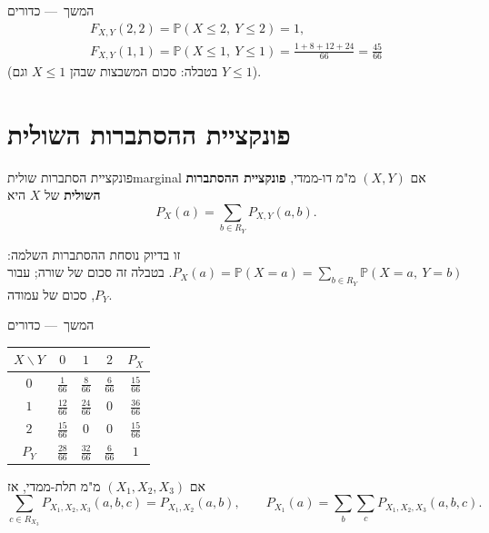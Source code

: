\documentclass[11pt,a4paper]{report}
\newcommand{\flag}{\tikz[baseline=-0.1ex,x=0.9ex,y=0.9ex]{\draw[line width=0.5pt] (0,-0.3)--(0,1.6); \fill (0,1.6)--(1.2,1.2)--(0,0.8)--cycle;}}
\newcounter{todo}
\newcommand{\addtodo}[1]{\refstepcounter{todo}%
  \addcontentsline{tdo}{todo}{\protect\numberline{\thetodo}#1}}
\newcommand{\needcheck}[1]{\addtodo{#1}%
  {\color{todoc}\sffamily\small\,[\textbf{\flag{}\,\thetodo\ לבדיקה:} #1]\,}}
\renewcommand{\needcheck}[1]{}
\newcommand{\PP}{\mathbb{P}}
\newcommand{\dash}{{\rmfamily —}}
\begin{document}
\begin{example}{המשך~\dash{} כדורים}{}
\begin{gather*}
  F_{X,Y}(2,2)=\PP(X\le2,\ Y\le2)=1,\\
  F_{X,Y}(1,1)=\PP(X\le1,\ Y\le1)=\frac{1+8+12+24}{66}=\frac{45}{66}
\end{gather*}
(בטבלה: סכום המשבצות שבהן $X\le1$ וגם $Y\le1$).
\needcheck{ברשימות נכתב רק "חיבור המשבצות"; השלמתי את הערך $\frac{45}{66}$}
\end{example}

\section{פונקציית ההסתברות השולית}

\begin{definition}{פונקציית הסתברות שולית}{marginal}
אם $(X,Y)$ מ"מ דו-ממדי, \textbf{פונקציית ההסתברות השולית} של $X$ היא
\[
  P_X(a)=\sum_{b\in R_Y}P_{X,Y}(a,b).
\]
\end{definition}

זו בדיוק נוסחת ההסתברות השלמה: $P_X(a)=\PP(X=a)=\sum_{b\in R_Y}\PP(X=a,\ Y=b)$. בטבלה זה סכום של שורה; עבור $P_Y$, סכום של עמודה.

\begin{example}{המשך~\dash{} כדורים}{}
\begin{center}
\renewcommand{\arraystretch}{1.5}
\begin{tabular}{c|ccc|c}
  $X\backslash Y$ & $0$ & $1$ & $2$ & $P_X$\\ \hline
  $0$ & $\frac1{66}$ & $\frac8{66}$ & $\frac6{66}$ & $\frac{15}{66}$\\
  $1$ & $\frac{12}{66}$ & $\frac{24}{66}$ & $0$ & $\frac{36}{66}$\\
  $2$ & $\frac{15}{66}$ & $0$ & $0$ & $\frac{15}{66}$\\ \hline
  $P_Y$ & $\frac{28}{66}$ & $\frac{32}{66}$ & $\frac6{66}$ & $1$
\end{tabular}
\end{center}
\end{example}

\begin{keybox}[title={באופן כללי}]
אם $(X_1,X_2,X_3)$ מ"מ תלת-ממדי, אז
\[
  \sum_{c\in R_{X_3}}P_{X_1,X_2,X_3}(a,b,c)=P_{X_1,X_2}(a,b),\qquad
  P_{X_1}(a)=\sum_b\sum_cP_{X_1,X_2,X_3}(a,b,c).
\]
\end{keybox}
\end{document}
